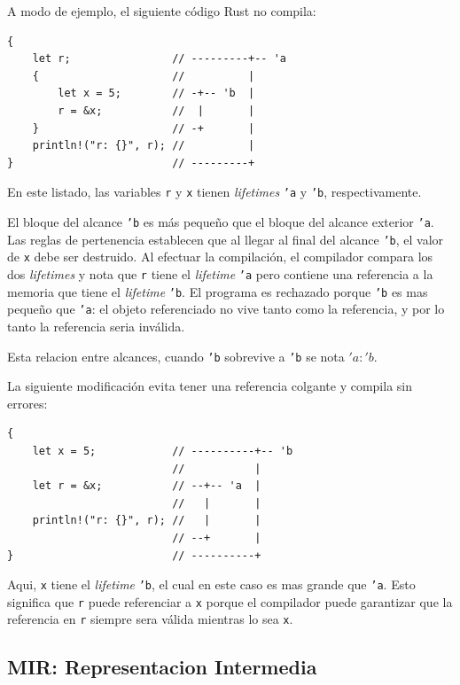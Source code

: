 \documentclass[11pt, a4paper]{article}
\begin{document}
A modo de ejemplo, el siguiente código Rust no compila:

\begin{verbatim}
{
    let r;                // ---------+-- 'a
    {                     //          |
        let x = 5;        // -+-- 'b  |
        r = &x;           //  |       |
    }                     // -+       |
    println!("r: {}", r); //          |
}                         // ---------+
\end{verbatim}

En este listado, las variables \texttt{r} y \texttt{x} tienen \textit{lifetimes} \texttt{'a} y \texttt{'b}, respectivamente.

El bloque del alcance \texttt{'b} es más pequeño que el bloque del alcance exterior \texttt{'a}.
Las reglas de pertenencia establecen que al llegar al final del alcance \texttt{'b}, el valor de \texttt{x} debe ser destruido.
Al efectuar la compilación, el compilador compara los dos \textit{lifetimes} y nota que \texttt{r} tiene el \textit{lifetime} \texttt{'a} pero contiene una referencia a la memoria que tiene el \textit{lifetime} \texttt{'b}.
El programa es rechazado porque \texttt{'b} es mas pequeño que \texttt{'a}: el objeto referenciado no vive tanto como la referencia, y por lo tanto la referencia seria inválida.

Esta relacion entre alcances, cuando \texttt{'b} sobrevive a \texttt{'b} se nota $'a: 'b$.

La siguiente modificación evita tener una referencia colgante y compila sin errores:

\begin{verbatim}
{
    let x = 5;            // ----------+-- 'b
                          //           |
    let r = &x;           // --+-- 'a  |
                          //   |       |
    println!("r: {}", r); //   |       |
                          // --+       |
}                         // ----------+
\end{verbatim}

Aqui, \texttt{x} tiene el \textit{lifetime} \texttt{'b}, el cual en este caso es mas grande que \texttt{'a}.
Esto significa que \texttt{r} puede referenciar a \texttt{x} porque el compilador puede garantizar que la referencia en \texttt{r} siempre sera válida mientras lo sea \texttt{x}.

\subsection{MIR: Representacion Intermedia}
\end{document}
